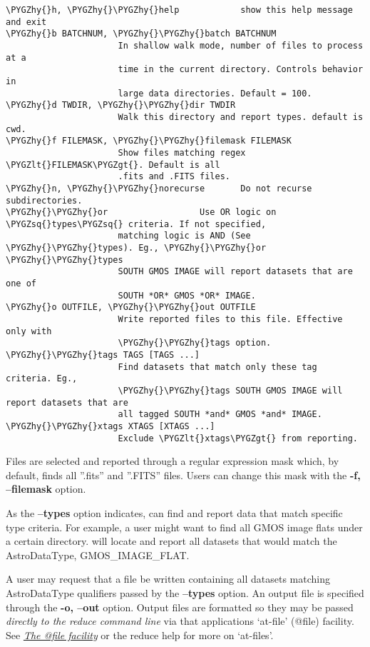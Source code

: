 \documentclass[letterpaper,10pt,english]{sphinxmanual}
\def\PYGZlt{\char`\<}
\def\PYGZgt{\char`\>}
\def\PYGZhy{\char`\-}
\def\PYGZsq{\char`\'}
\begin{document}
\begin{Verbatim}[commandchars=\\\{\}]
\PYGZhy{}h, \PYGZhy{}\PYGZhy{}help            show this help message and exit
\PYGZhy{}b BATCHNUM, \PYGZhy{}\PYGZhy{}batch BATCHNUM
                      In shallow walk mode, number of files to process at a
                      time in the current directory. Controls behavior in
                      large data directories. Default = 100.
\PYGZhy{}d TWDIR, \PYGZhy{}\PYGZhy{}dir TWDIR
                      Walk this directory and report types. default is cwd.
\PYGZhy{}f FILEMASK, \PYGZhy{}\PYGZhy{}filemask FILEMASK
                      Show files matching regex \PYGZlt{}FILEMASK\PYGZgt{}. Default is all
                      .fits and .FITS files.
\PYGZhy{}n, \PYGZhy{}\PYGZhy{}norecurse       Do not recurse subdirectories.
\PYGZhy{}\PYGZhy{}or                  Use OR logic on \PYGZsq{}types\PYGZsq{} criteria. If not specified,
                      matching logic is AND (See \PYGZhy{}\PYGZhy{}types). Eg., \PYGZhy{}\PYGZhy{}or \PYGZhy{}\PYGZhy{}types
                      SOUTH GMOS IMAGE will report datasets that are one of
                      SOUTH *OR* GMOS *OR* IMAGE.
\PYGZhy{}o OUTFILE, \PYGZhy{}\PYGZhy{}out OUTFILE
                      Write reported files to this file. Effective only with
                      \PYGZhy{}\PYGZhy{}tags option.
\PYGZhy{}\PYGZhy{}tags TAGS [TAGS ...]
                      Find datasets that match only these tag criteria. Eg.,
                      \PYGZhy{}\PYGZhy{}tags SOUTH GMOS IMAGE will report datasets that are
                      all tagged SOUTH *and* GMOS *and* IMAGE.
\PYGZhy{}\PYGZhy{}xtags XTAGS [XTAGS ...]
                      Exclude \PYGZlt{}xtags\PYGZgt{} from reporting.
\end{Verbatim}

Files are selected and reported through a regular expression mask which,
by default, finds all ''.fits'' and ''.FITS'' files. Users can change this mask
with the \textbf{-f, --filemask} option.

As the \textbf{--types} option indicates,  can find and report data that
match specific type criteria. For example, a user might want to find all GMOS
image flats under a certain directory.  will locate and report all
datasets that would match the AstroDataType, GMOS\_IMAGE\_FLAT.

A user may request that a file be written containing all datasets
matching AstroDataType qualifiers passed by the \textbf{--types} option. An output
file is specified through the \textbf{-o, --out} option. Output files are formatted
so they may be passed \emph{directly to the reduce command line} via that applications
`at-file' (@file) facility. See {\hyperref[interfaces:atfile]{\emph{The @file facility}}} or the reduce help for more on
`at-files'.
\end{document}
